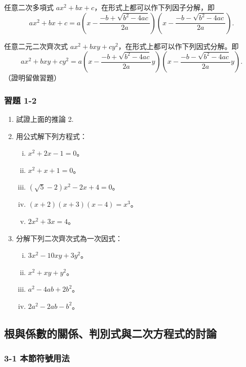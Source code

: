 \begin{corollary}\label{cor:b2_1-1}
任意二次多項式 $ax^2+bx+c$，在形式上都可以作下列因子分解，即
\[
ax^2+bx+c = a\left(x - \frac{-b+\sqrt{b^2-4ac}}{2a}\right)\left(x - \frac{-b-\sqrt{b^2-4ac}}{2a}\right).
\]
\end{corollary}

\begin{corollary}\label{cor:b2_1-2}
任意二元二次齊次式 $ax^2+bxy+cy^2$，在形式上都可以作下列因式分解。即
\[
ax^2+bxy+cy^2 = a\left(x - \frac{-b+\sqrt{b^2-4ac}}{2a}y\right)\left(x - \frac{-b-\sqrt{b^2-4ac}}{2a}y\right).
\]
\hfill （證明留做習題）\label{note:b2-ch1-cor2}
\end{corollary}

\subsubsection*{習題 1-2}\label{sec:b2_ex1-2}

\begin{enumerate}
  \item 試證上面的推論 2.

  \item 用公式解下列方程式：
  \begin{enumerate}[(i)]
    \item $x^2+2x-1=0$。
    \item $x^2+x+1=0$。
    \item $(\sqrt{5}-2)x^2-2x+4=0$。
    \item $(x+2)(x+3)(x-4)=x^3$。
    \item $2x^2+3x=4$。
  \end{enumerate}

  \item 分解下列二次齊次式為一次因式：
  \begin{enumerate}[(i)]
    \item $3x^2-10xy+3y^2$。
    \item $x^2+xy+y^2$。
    \item $a^2-4ab+2b^2$。
    \item $2a^2-2ab-b^2$。
  \end{enumerate}
\end{enumerate}

\subsection{根與係數的關係、判別式與二次方程式的討論}\label{sec:b2_1-3}

\subsubsection*{3-1 本節符號用法}


